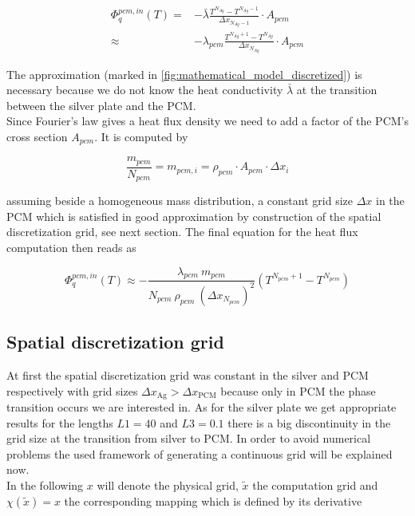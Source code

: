 \documentclass{scrartcl}[12pt, halfparskip]
\numberwithin{equation}{section}
\numberwithin{figure}{section}
\numberwithin{table}{section}
\begin{document}
\begin{align}
	\varPhi_{q}^{pcm,in}(T) = & - \bar{\lambda} \frac{T^{N_{Ag}} - T^{N_{Ag}-1}}{\Delta x_{N_{Ag}-1}} \cdot A_{pcm} \\
	\approx & - \lambda_{pcm} \frac{T^{N_{Ag}+1} - T^{N_{Ag}}}{\Delta x_{N_{Ag}}} \cdot A_{pcm} \nonumber
\end{align}

The approximation (marked in \cref{fig:mathematical_model_discretized}) is necessary because we do not know the heat conductivity $\bar{\lambda}$ at the transition between the silver plate and the PCM. \\
Since Fourier's law gives a heat flux density we need to add a factor of the PCM's cross section $A_{pcm}$. It is computed by

\begin{equation}
	\frac{m_{pcm}}{N_{pcm}} = m_{pcm,i} = \rho_{pcm} \cdot A_{pcm} \cdot \Delta x_i 
\end{equation}

assuming beside a homogeneous mass distribution, a constant grid size $\Delta x$ in the PCM which is satisfied in good approximation by construction of the spatial discretization grid, see next section. The final equation for the heat flux computation then reads as

\begin{equation}
	\varPhi_{q}^{pcm,in}(T) \approx - \frac{\lambda_{pcm} \ m_{pcm}}{N_{pcm} \ \rho_{pcm} \ (\Delta x_{N_{pcm}})^2} \left( T^{N_{pcm}+1} - T^{N_{pcm}} \right)
	\label{eq:heat_flux_computation_final}
\end{equation}


\subsection{Spatial discretization grid}
\label{sec:spatial_discretization_grid}
At first the spatial discretization grid was constant in the silver and PCM respectively with grid sizes $\Delta x_{\text{Ag}} > \Delta x_{\text{PCM}}$ because only in PCM the phase transition occurs we are interested in. As for the silver plate we get appropriate results for the lengths $L1=40$ and $L3=0.1$ there is a big discontinuity in the grid size at the transition from silver to PCM. In order to avoid numerical problems the used framework of generating a continuous grid will be explained now. \\
In the following $x$ will denote the physical grid, $\tilde{x}$ the computation grid and $\chi(\tilde{x}) = x$ the corresponding mapping which is defined by its derivative
\end{document}
